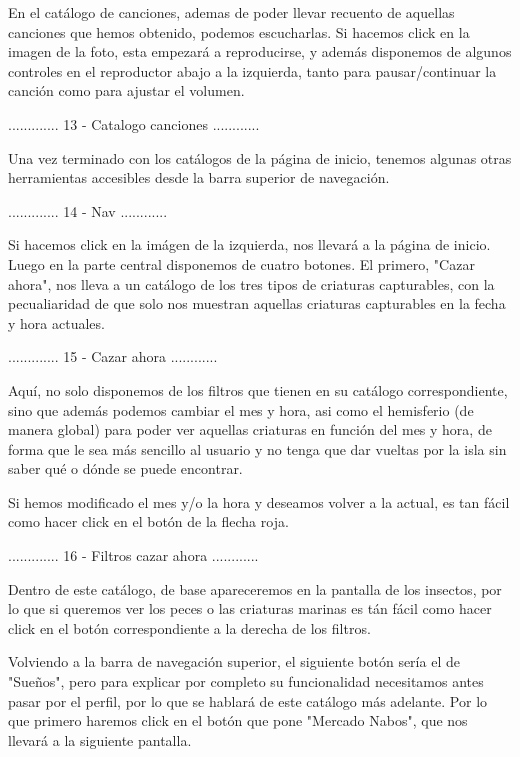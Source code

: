 
En el catálogo de canciones, ademas de poder llevar recuento de aquellas canciones que hemos obtenido, podemos escucharlas. Si hacemos click en la imagen de la foto, esta empezará a reproducirse, y además disponemos de algunos controles en el reproductor abajo a la izquierda, tanto para pausar/continuar la canción como para ajustar el volumen.

............. 13 - Catalogo canciones ............

Una vez terminado con los catálogos de la página de inicio, tenemos algunas otras herramientas
accesibles desde la barra superior de navegación.

............. 14 - Nav ............

Si hacemos click en la imágen de la izquierda, nos llevará a la página de inicio.
Luego en la parte central disponemos de cuatro botones. El primero, "Cazar ahora", nos lleva
a un catálogo de los tres tipos de criaturas capturables, con la pecualiaridad de que solo
nos muestran aquellas criaturas capturables en la fecha y hora actuales.

............. 15 - Cazar ahora ............

Aquí, no solo disponemos de los filtros que tienen en su catálogo correspondiente, sino que
además podemos cambiar el mes y hora, asi como el hemisferio (de manera global) para poder
ver aquellas criaturas en función del mes y hora, de forma que le sea más sencillo al usuario
y no tenga que dar vueltas por la isla sin saber qué o dónde se puede encontrar.

Si hemos modificado el mes y/o la hora y deseamos volver a la actual, es tan fácil como
hacer click en el botón de la flecha roja.

............. 16 - Filtros cazar ahora ............

Dentro de este catálogo, de base apareceremos en la pantalla de los insectos, por lo que si
queremos ver los peces o las criaturas marinas es tán fácil como hacer click en el botón
correspondiente a la derecha de los filtros.

Volviendo a la barra de navegación superior, el siguiente botón sería el de "Sueños", pero para
explicar por completo su funcionalidad necesitamos antes pasar por el perfil, por lo que se
hablará de este catálogo más adelante. Por lo que primero haremos click en el botón que
pone "Mercado Nabos", que nos llevará a la siguiente pantalla.

